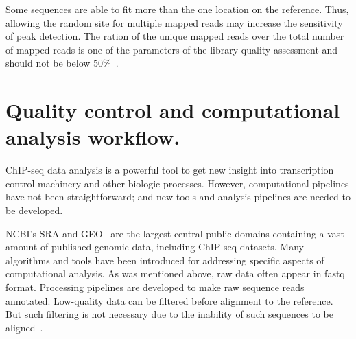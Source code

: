 Some sequences are able to fit more than the one location on the reference. Thus, allowing the random site for multiple mapped reads may increase the sensitivity of peak detection. 
The ration of the unique mapped reads over the total number of mapped reads is one of the parameters of the library quality assessment and should not be below 50\%~\cite{shin2013computational}.













\section{Quality control and computational analysis workflow.}


ChIP-seq data analysis is a powerful tool to get new insight into transcription control machinery and other biologic processes. 
However, computational pipelines have not been straightforward; 
and new tools and analysis pipelines are needed to be developed.

NCBI's SRA and GEO~\cite{barrett2012ncbi} are the largest central public domains containing a vast amount of published genomic data, including ChIP-seq datasets. 
Many algorithms and tools have been introduced for addressing specific aspects of computational analysis. 
As was mentioned above, raw data often appear in fastq format. 
Processing pipelines are developed to make raw sequence reads annotated.
Low-quality data can be filtered before alignment to the reference. 
But such filtering is not necessary due to the inability of such sequences to be aligned~\cite{furey2012chip}.




